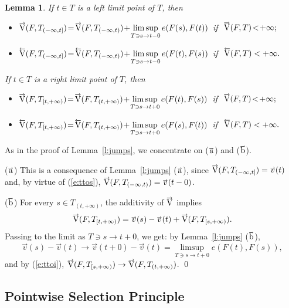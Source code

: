 \documentclass[preprint,12pt]{elsarticle}
\newtheorem{lem}{Lemma}
\newcommand{\eq}[1]{\mbox{\rm(\ref{#1})}}
\newcommand{\riV}{{\scriptstyle\overrightarrow{\mbox{\rm V}}}}
\newcommand{\leV}{{\scriptstyle\overleftarrow{\mbox{\rm V}}}}
\newcommand{\ori}[1]{{\scriptscriptstyle\overrightarrow{\mbox{$#1$}}}}
\newcommand{\ole}[1]{{\scriptscriptstyle\overleftarrow{\mbox{$#1$}}}}
\begin{document}
\begin{lem} \label{l:opej}
If $t\in T$ is a left limit point of $T$, then
  \begin{itemize}
\item[${\rm(\ori{\mbox{\rm a}})}$]
$\riV(F,T_{(-\infty,t]})\!=\!\riV(F,T_{(-\infty,t)})\!+\!\displaystyle
  \limsup_{T\ni s\to t-0}e(F(s),F(t))$ \,if \,\,$\riV(F,T)\!<\!+\infty;$
\item[${\rm(\ole{\mbox{\rm a}})}$]
$\leV(F,T_{(-\infty,t]})\!=\!\leV(F,T_{(-\infty,t)})\!+\!\displaystyle
  \limsup_{T\ni s\to t-0}e(F(t),F(s))$ \,if \,\,$\leV(F,T)<+\infty.$
  \end{itemize}

If $t\in T$ is a right limit point of $T$, then
  \begin{itemize}
\item[${\rm(\ori{\mbox{\rm b}})}$]
$\riV(F,T_{[t,+\infty)})\!=\!\riV(F,T_{(t,+\infty)})\!+\!\displaystyle
  \limsup_{T\ni s\to t+0}e(F(t),F(s))$ \,if \,\,$\riV(F,T)\!<\!+\infty;$
\item[${\rm(\ole{\mbox{\rm b}})}$]
$\leV(F,T_{[t,+\infty)})\!=\!\leV(F,T_{(t,+\infty)})\!+\!\displaystyle
  \limsup_{T\ni s\to t+0}e(F(s),F(t))$ \,if \,\,$\leV(F,T)<+\infty.$
  \end{itemize}
\end{lem}

\begin{pf}
As in the proof of Lemma~\ref{l:jumps}, we concentrate 
on ($\ori{\mbox{\rm a}}$) and ($\ori{\mbox{\rm b}}$).

($\ori{\mbox{\rm a}}$) This is a consequence of Lemma~\ref{l:jumps}%
($\ori{\mbox{\rm a}}$), since $\riV(F,T_{(-\infty,t]})=\ori{v}(t)$ and,
by virtue of \eq{e:ttos}, $\riV(F,T_{(-\infty,t)})=\ori{v}(t-0)$.

($\ori{\mbox{\rm b}}$) For every $s\in T_{(t,+\infty)}$, the additivity of $\riV$ implies
  \begin{equation*}
\riV(F,T_{[t,+\infty)})=\ori{v}(s)-\ori{v}(t)+\riV(F,T_{[s,+\infty)}).
  \end{equation*}
Passing to the limit as $T\ni s\to t+0$, we get: by Lemma~\ref{l:jumps}%
($\ori{\mbox{\rm b}}$),
  \begin{equation*}
\ori{v}(s)-\ori{v}(t)\to\ori{v}(t+0)-\ori{v}(t)=\limsup_{T\ni s\to t+0}e(F(t),F(s)),
  \end{equation*}
and by \eq{e:ttoi}, $\riV(F,T_{[s,+\infty)})\to\riV(F,T_{(t,+\infty)})$.
\qed\end{pf}

\subsection{Pointwise Selection Principle}
\end{document}
